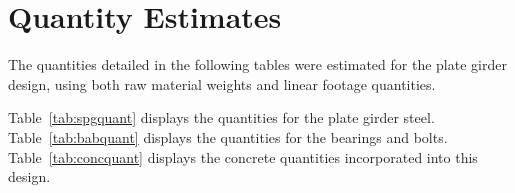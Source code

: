 \section{Quantity Estimates}
The quantities detailed in the following tables were estimated for the plate girder design, using both raw material weights and linear footage quantities.

Table~\ref{tab:spgquant} displays the quantities for the plate girder steel. Table~\ref{tab:babquant} displays the quantities for the bearings and bolts. Table~\ref{tab:concquant} displays the concrete quantities incorporated into this design.

\begin{table}[H]
\centering
\caption{Steel Plate Girder Quantities}\label{tab:spgquant}
\vspace{0.5cm}
\end{table}

